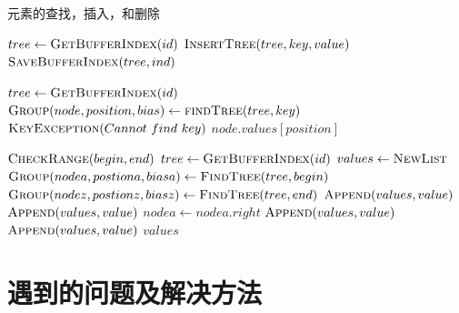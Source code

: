 \documentclass[UTF8]{ctexrep} %
\begin{document}
\begin{algorithm}
    \caption{元素的查找，插入，和删除}
    \label{alg:operation_element}
    \begin{algorithmic}
            \State $tree \leftarrow \Call{GetBufferIndex}{id}$
            \State $\Call{InsertTree}{tree, key, value}$
            \State $\Call{SaveBufferIndex}{tree, ind}$ 
        \EndFunction
        
            \State $tree \leftarrow \Call{GetBufferIndex}{id}$
            \State $\Call{Group}{node, position, bias} \leftarrow \Call{findTree}{tree, key}$
                \State \Raise $\Call{KeyException}{Cannot\ find\ key}$
            \Else
                \State \Return $node.values[position]$
            \EndIf
        \EndFunction
        
            \State $\Call{CheckRange}{begin, end}$ 
            \State $tree \leftarrow \Call{GetBufferIndex}{id}$
            \State $values \leftarrow \Call{NewList}{}$
            \State $\Call{Group}{nodea, postiona, biasa} \leftarrow \Call{FindTree}{tree, begin}$
            \State $\Call{Group}{nodez, postionz, biasz} \leftarrow \Call{FindTree}{tree, end}$
             
                    \State $\Call{Append}{values, value}$
                \EndFor
            \Else
                    \State $\Call{Append}{values, value}$
                \EndFor
                    \State $nodea \leftarrow nodea.right$
                            \State $\Call{Append}{values, value}$
                        \EndFor
                \EndWhile
                    \State $\Call{Append}{values, value}$
                \EndFor
            \EndIf
            \State \Return $values$
        \EndFunction
    \end{algorithmic}
\end{algorithm}

\chapter{遇到的问题及解决方法}
\end{document}
